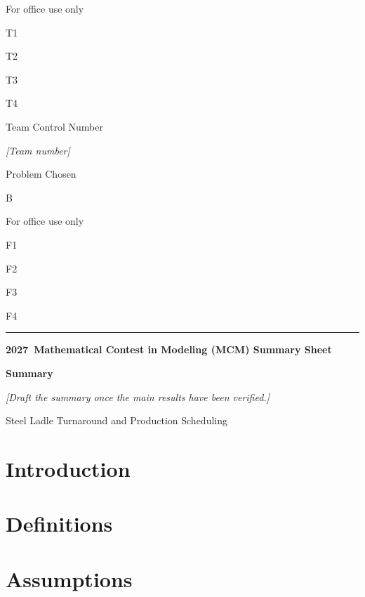\documentclass[12pt,letterpaper,scheme=plain,fontset=none]{ctexart}
\newcommand{\ContestYear}{2027}
\newcommand{\TeamNumber}{\textit{[Team number]}}
\newcommand{\ProblemChosen}{B}
\newcommand{\PaperTitle}{Steel Ladle Turnaround and Production Scheduling}
\begin{document}
\clearpage
{\sffamily
\noindent
\begin{minipage}[t]{.24\textwidth}
\small
For office use only\par
T1\,\hrulefill\par
T2\,\hrulefill\par
T3\,\hrulefill\par
T4\,\hrulefill
\end{minipage}\hfill
\begin{minipage}[t]{.40\textwidth}
\centering\small
Team Control Number\par
{\Large \TeamNumber\par}
\smallskip
Problem Chosen\par
{\large \ProblemChosen\par}
\end{minipage}\hfill
\begin{minipage}[t]{.24\textwidth}
\small
For office use only\par
F1\,\hrulefill\par
F2\,\hrulefill\par
F3\,\hrulefill\par
F4\,\hrulefill
\end{minipage}
\par\smallskip\hrule
\begin{center}
\textbf{\ContestYear\ Mathematical Contest in Modeling (MCM) Summary Sheet}\par
\medskip
{\Large\bfseries Summary\par}
\end{center}}
\noindent\textit{[Draft the summary once the main results have been verified.]}

\clearpage
{}
\hypersetup{pageanchor=true}
\begin{center}
{\Large\sffamily \PaperTitle\par}
\end{center}
{\sffamily\hypersetup{linkcolor=blue}\tableofcontents}

\clearpage
\pagestyle{schoolbody}
\section{Introduction}
\section{Definitions}
\section{Assumptions}
\end{document}
